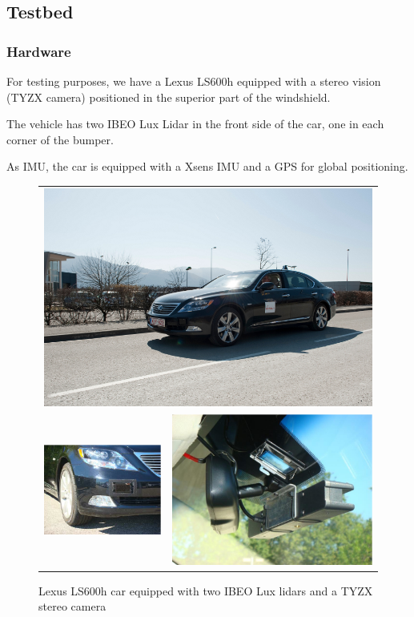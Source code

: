 \subsection{Testbed}
\label{sec:testbed}

\subsubsection*{Hardware}

For testing purposes, we have a Lexus LS600h equipped with a stereo vision (TYZX camera) positioned in the superior part of the windshield.

The vehicle has two IBEO Lux Lidar in the front side of the car, one in each corner of the bumper.

As IMU, the car is equipped with a Xsens IMU and a GPS for global positioning.

\begin{figure}[h]
   \centering
     \begin{tabular}{lr}
     \multicolumn{2}{c}{ \includegraphics[width=0.55\columnwidth]{img/testbed:car}}\\
       \includegraphics[width=0.40\columnwidth]{img/testbed:ibeo}
       &\includegraphics[width=0.40\columnwidth]{img/testbed:tyzx}
     \end{tabular}
   \caption{Lexus LS600h car equipped with two IBEO Lux lidars and a TYZX
     stereo camera}
   \label{fig:Lexus}
 \end{figure}

